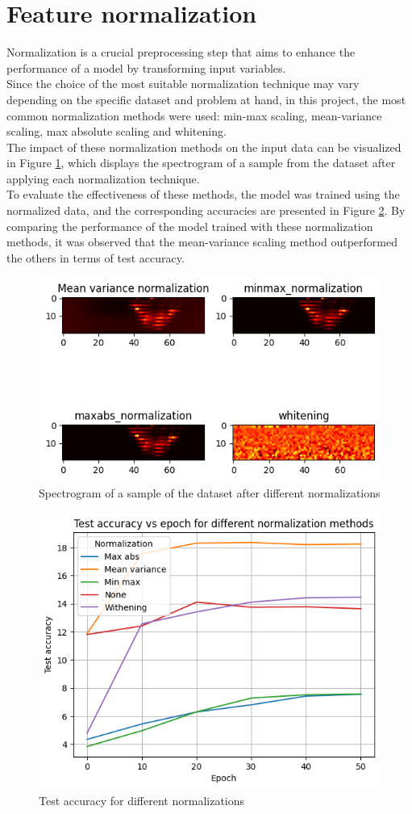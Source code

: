 \documentclass{class}
\begin{document}
\section{Feature normalization}
Normalization is a crucial preprocessing step that aims to enhance the performance of a model by transforming input variables. \\
Since the choice of the most suitable normalization technique may vary depending on the specific dataset and problem at hand,
in this project, the most common normalization methods were used: min-max scaling, mean-variance scaling, max absolute scaling and whitening.\\
The impact of these normalization methods on the input data can be visualized in Figure \ref{fig-8}, which displays the spectrogram of a sample from the dataset after applying each normalization technique. \\
To evaluate the effectiveness of these methods, the model was trained using the normalized data, and the corresponding accuracies are presented in Figure \ref{fig-9}.
By comparing the performance of the model trained with these normalization methods, it was observed that the mean-variance scaling method outperformed the others in terms of test accuracy.
\begin{figure}[H]
  \centering
  \includegraphics[width=.8\columnwidth]{images/normalization_spectrogram.png}
  \caption{Spectrogram of a sample of the dataset after different normalizations}
  \label{fig-8}
\end{figure}

\begin{figure}[H]
  \centering
  \includegraphics[width=.8\columnwidth]{images/test_diff_normalizations.png}
  \caption{Test accuracy for different normalizations}
  \label{fig-9}
\end{figure}
\end{document}
